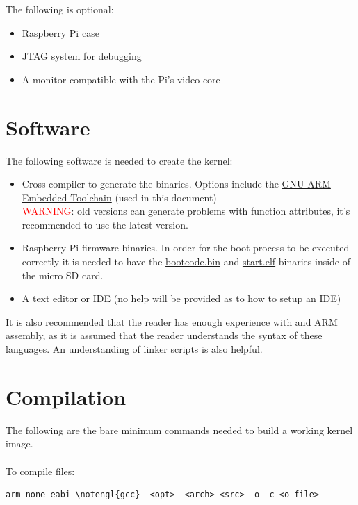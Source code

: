 \documentclass[12pt, svgnames]{book}
\begin{document}
The following is optional:

\begin{itemize}
	\item Raspberry Pi case
	\item JTAG system for debugging
	\item A monitor compatible with the Pi's video core
\end{itemize}

\section{Software}
\label{sec:Software}
The following software is needed to create the kernel:

\begin{itemize}
	\item Cross compiler to generate the binaries. Options include the \href{https://launchpad.net/\notengl{gcc}-arm-embedded}{GNU ARM Embedded Toolchain} (used in this document)
	\\
	\textcolor{red}{WARNING}: old  versions can generate problems with function attributes, it's recommended to use the latest  version.
	\item Raspberry Pi firmware binaries. In order for the boot process to be executed correctly it is needed to have the \href{https://github.com/raspberrypi/firmware/blob/master/boot/bootcode.bin}{bootcode.bin} and \href{https://github.com/raspberrypi/firmware/blob/master/boot/start.elf}{start.elf} binaries inside of the micro SD card.
	\item A text editor or IDE (no help will be provided as to how to setup an IDE)
\end{itemize}

It is also recommended that the reader has enough experience with  and ARM assembly, as it is assumed that the reader understands the syntax of these languages. An understanding of linker scripts is also helpful.

\section{Compilation}
\label{sec:compilation}
The following are the bare minimum commands needed to build a working kernel image. 
\\~\\
To compile  files:

\lstset{language=GCC}
\begin{lstlisting}[style = bash, xleftmargin=0\textwidth]
	arm-none-eabi-\notengl{gcc} -<opt> -<arch> <src> -o -c <o_file>
\end{lstlisting}
\end{document}
